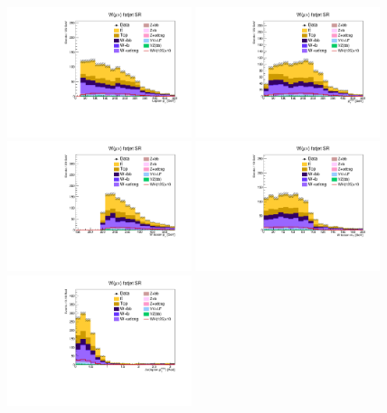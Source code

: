 \begin{figure}[tbp]
  \begin{center}
    \includegraphics[width=0.48\textwidth]{figures/wlnhbb2016/boosted/WmnWHFJSR_lepton1Pt.pdf}
    \includegraphics[width=0.48\textwidth]{figures/wlnhbb2016/boosted/WmnWHFJSR_pfmet.pdf}
    \includegraphics[width=0.48\textwidth]{figures/wlnhbb2016/boosted/WmnWHFJSR_topWBosonPt.pdf}
    \includegraphics[width=0.48\textwidth]{figures/wlnhbb2016/boosted/WmnWHFJSR_mT.pdf}
    \includegraphics[width=0.48\textwidth]{figures/wlnhbb2016/boosted/WmnWHFJSR_deltaPhiLep1Met.pdf}

\end{center}
\end{figure}
